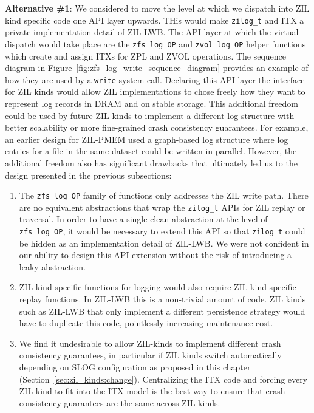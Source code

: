 \documentclass[12pt,a4paper,twoside]{book}
\begin{document}
\textbf{Alternative \#1}: We considered to move the level at which we dispatch into ZIL kind specific code one API layer upwards.
THis would make \lstinline{zilog_t} and ITX a private implementation detail of ZIL-LWB.
The API layer at which the virtual dispatch would take place are the \lstinline{zfs_log_OP} and \lstinline{zvol_log_OP} helper functions which create and assign ITXs for ZPL and ZVOL operations.
The sequence diagram in Figure~\ref{fig:zfs_log_write_sequence_diagram} provides an example of how they are used by a \lstinline{write} system call.
Declaring this API layer the interface for ZIL kinds would allow ZIL implementations to chose freely how they want to represent log records in DRAM and on stable storage.
This additional freedom could be used by future ZIL kinds to implement a different log structure with better scalability or more fine-grained crash consistency guarantees.
For example, an earlier design for ZIL-PMEM used a graph-based log structure where log entries for a file in the same dataset could be written in parallel.
However, the additional freedom also has significant drawbacks that ultimately led us to the design presented in the previous subsections:
\begin{enumerate}[noitemsep]
    \item The \lstinline{zfs_log_OP} family of functions only addresses the ZIL write path.
        There are no equivalent abstractions that wrap the \lstinline{zilog_t} APIs for ZIL replay or traversal.
        In order to have a single clean abstraction at the level of \lstinline{zfs_log_OP}, it would be necessary to extend this API so that \lstinline{zilog_t} could be hidden as an implementation detail of ZIL-LWB.
        We were not confident in our ability to design this API extension without the risk of introducing a leaky abstraction.
    \item ZIL kind specific functions for logging would also require ZIL kind specific replay functions.
        In ZIL-LWB this is a non-trivial amount of code.
        ZIL kinds such as ZIL-LWB that only implement a different persistence strategy would have to duplicate this code, pointlessly increasing maintenance cost.
    \item We find it undesirable to allow ZIL-kinds to implement different crash consistency guarantees, in particular if ZIL kinds switch automatically depending on SLOG configuration as proposed in this chapter (Section~\ref{sec:zil_kinds:change}).
        Centralizing the ITX code and forcing every ZIL kind to fit into the ITX model is the best way to ensure that crash consistency guarantees are the same across ZIL kinds.
\end{enumerate}
\end{document}
